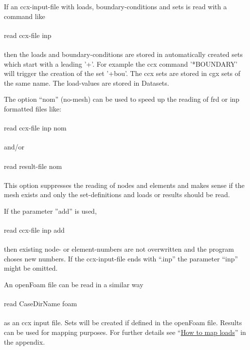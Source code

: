 \documentclass{article}
\providecommand{\htmlref}[2]{\hyperref[#2]{#1}}
\begin{document}
If an ccx-input-file with loads, boundary-conditions and sets is read with a command like\\\\read ccx-file inp\\\\then the loads and boundary-conditions are stored in automatically created sets which start with a leading '+'. For example the ccx command '*BOUNDARY' will trigger the creation of the set '+bou'. The ccx sets are stored in cgx sets of the same name. The load-values are stored in Datasets.

The option ``nom'' (no-mesh) can be used to speed up the reading of frd or inp formatted files like:\\\\read ccx-file inp nom\\\\and/or\\\\read result-file nom\\\\This option suppresses the reading of nodes and elements and makes sense if the mesh exists and only the set-definitions and loads or results should be read. 

If the parameter ''add'' is used,\\\\read ccx-file inp add\\\\ then existing node- or element-numbers are not overwritten and the program choses new numbers. If the ccx-input-file ends with ``.inp'' the parameter ``inp'' might be omitted.

An openFoam file \cite{OpenFOAM} can be read in a similar way\\\\read CaseDirName foam\\\\as an ccx input file. Sets will be created if defined in the openFoam file. Results can be used for mapping purposes. For further details see ``\htmlref{How to map loads}{How to map loads}'' in the appendix.
\end{document}

